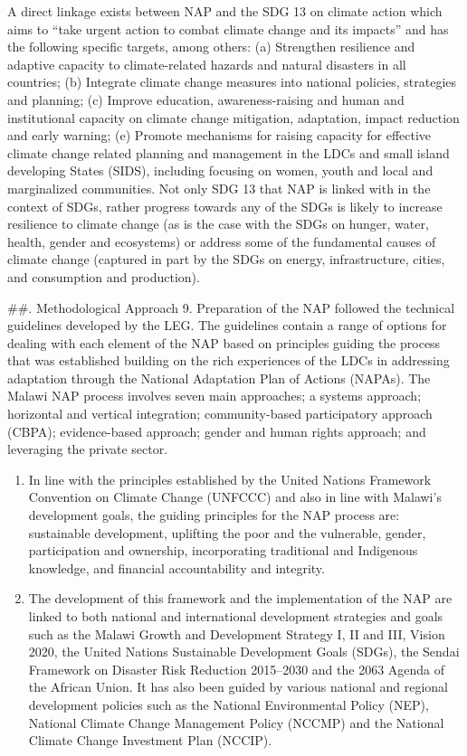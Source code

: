 \documentclass[
]{book}
\begin{document}
\begin{enumerate}
  A direct linkage exists between NAP and the SDG 13 on climate action which aims to ``take urgent action to combat climate change and its impacts'' and has the following specific targets, among others: (a) Strengthen resilience and adaptive capacity to climate-related hazards and natural disasters in all countries; (b) Integrate climate change measures into national policies, strategies and planning; (c) Improve education, awareness-raising and human and institutional capacity on climate change mitigation, adaptation, impact reduction and early warning; (e) Promote mechanisms for raising capacity for effective climate change related planning and management in the LDCs and small island developing States (SIDS), including focusing on women, youth and local and marginalized communities. Not only SDG 13 that NAP is linked with in the context of SDGs, rather progress towards any of the SDGs is likely to increase resilience to climate change (as is the case with the SDGs on hunger, water, health, gender and ecosystems) or address some of the fundamental causes of climate change (captured in part by the SDGs on energy, infrastructure, cities, and consumption and production).
\end{enumerate}

\#\#. Methodological Approach
9. Preparation of the NAP followed the technical guidelines developed by the LEG. The guidelines contain a range of options for dealing with each element of the NAP based on principles guiding the process that was established building on the rich experiences of the LDCs in addressing adaptation through the National Adaptation Plan of Actions (NAPAs). The Malawi NAP process involves seven main approaches; a systems approach; horizontal and vertical integration; community-based participatory approach (CBPA); evidence-based approach; gender and human rights approach; and leveraging the private sector.

\begin{enumerate}
\def\labelenumi{\arabic{enumi}.}
\setcounter{enumi}{9}
\item
  In line with the principles established by the United Nations Framework Convention on Climate Change (UNFCCC) and also in line with Malawi's development goals, the guiding principles for the NAP process are: sustainable development, uplifting the poor and the vulnerable, gender, participation and ownership, incorporating traditional and Indigenous knowledge, and financial accountability and integrity.
\item
  The development of this framework and the implementation of the NAP are linked to both national and international development strategies and goals such as the Malawi Growth and Development Strategy I, II and III, Vision 2020, the United Nations Sustainable Development Goals (SDGs), the Sendai Framework on Disaster Risk Reduction 2015--2030 and the 2063 Agenda of the African Union. It has also been guided by various national and regional development policies such as the National Environmental Policy (NEP), National Climate Change Management Policy (NCCMP) and the National Climate Change Investment Plan (NCCIP).
\end{enumerate}
\end{document}
